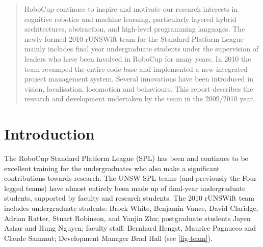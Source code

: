 \documentclass[pdftex,11pt,a4paper]{report}
\begin{document}

\newpage

\begin{abstract}
RoboCup continues to inspire and motivate our research interests in cognitive robotics and machine learning, particularly layered hybrid architectures, abstraction, and high-level programming languages. The newly formed 2010 rUNSWift team for the Standard Platform League mainly includes final year undergraduate students under the supervision of  leaders who have been involved in RoboCup for many years. In 2010 the team revamped the entire code-base and  implemented a new integrated project management system. Several innovations have been introduced in vision, localisation, locomotion and behaviours. This report describes the research and development undertaken by the team in the 2009/2010 year.
\end{abstract}

\newpage
\tableofcontents
\newpage
{}

\newpage
\chapter{Introduction}

The RoboCup Standard Platform League (SPL) has been and continues to be
excellent training for the undergraduates who also make a significant
contributions towards research. The UNSW SPL teams (and previously the
Four-legged teams) have almost entirely been made up of final-year undergraduate
students, supported by faculty and research students. The 2010 rUNSWift team
includes undergraduate students: Brock White, Benjamin Vance, David Claridge,
Adrian Ratter, Stuart Robinson, and Yanjin Zhu; postgraduate students Jayen
Ashar and Hung Nguyen; faculty staff: Bernhard Hengst, Maurice Pagnucco and
Claude Sammut; Development Manager Brad Hall (see \autoref{fig-team}).
\end{document}

